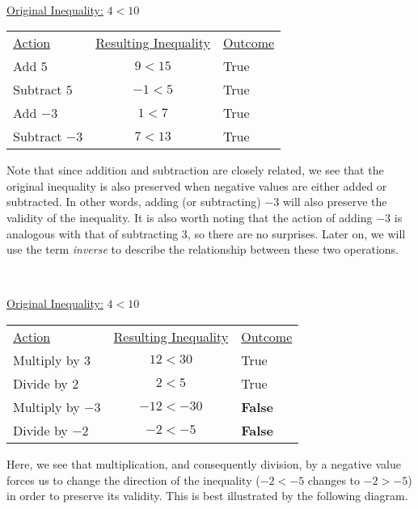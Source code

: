 \begin{example}\label{Lin95}
	\
\end{example}
\underline{Original Inequality:} $4<10$
\begin{center}
\begin{tabular}{lcl}
\underline{Action} & \underline{Resulting Inequality} & \underline{Outcome}\\
Add $5$ & $9<15$ & True\\
Subtract $5$ & $-1<5$ & True\\
Add $-3$ & $1<7$ & True\\
Subtract $-3$ & $7<13$ & True\\
\end{tabular}
\end{center}
Note that since addition and subtraction are closely related, we see that the original inequality is also preserved when negative values are either added or subtracted.  In other words, adding (or subtracting) $-3$ will also preserve the validity of the inequality.  It is also worth noting that the action of adding $-3$ is analogous with that of subtracting $3$, so there are no surprises.  Later on, we will use the term \textit{inverse} to describe the relationship between these two operations.\par
~\par
\underline{Original Inequality:} $4<10$
\begin{center}
\begin{tabular}{lcl}
\underline{Action} & \underline{Resulting Inequality} & \underline{Outcome}\\
Multiply by $3$ & $12<30$ & True\\
Divide by $2$ & $2<5$ & True\\
Multiply by $-3$ & $-12<-30$ & {\bf False}\\
Divide by $-2$ & $-2<-5$ & {\bf False}\\
\end{tabular}
\end{center}
Here, we see that multiplication, and consequently division, by a negative value forces us to change the direction of the inequality ($-2<-5$ changes to $-2>-5$) in order to preserve its validity.  This is best illustrated by the following diagram.

